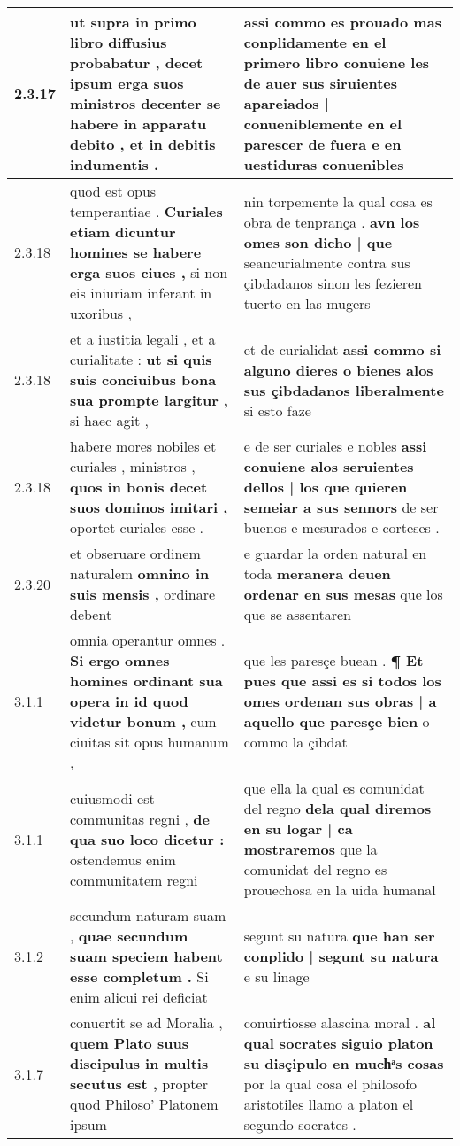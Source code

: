 \begin{tabular}{|p{1cm}|p{6.5cm}|p{6.5cm}|}
2.3.17 & ut supra in primo libro diffusius probabatur , \textbf{ decet ipsum erga suos ministros decenter se habere in apparatu debito , } et in debitis indumentis . & assi commo es prouado mas conplidamente en el primero libro \textbf{ conuiene les de auer sus siruientes apareiados | conueniblemente en el parescer de fuera } e en uestiduras conuenibles \\\hline
2.3.18 & quod est opus temperantiae . \textbf{ Curiales etiam dicuntur homines se habere erga suos ciues , } si non eis iniuriam inferant in uxoribus , & nin torpemente la qual cosa es obra de tenprança . \textbf{ avn los omes son dicho | que } seancurialmente contra sus çibdadanos sinon les fezieren tuerto en las mugers \\\hline
2.3.18 & et a iustitia legali , et a curialitate : \textbf{ ut si quis suis conciuibus bona sua prompte largitur , } si haec agit , & et de curialidat \textbf{ assi commo si alguno dieres o bienes alos sus çibdadanos liberalmente } si esto faze \\\hline
2.3.18 & habere mores nobiles et curiales , ministros , \textbf{ quos in bonis decet suos dominos imitari , } oportet curiales esse . & e de ser curiales e nobles \textbf{ assi conuiene alos seruientes dellos | los que quieren semeiar a sus sennors } de ser buenos e mesurados e corteses . \\\hline
2.3.20 & et obseruare ordinem naturalem \textbf{ omnino in suis mensis , } ordinare debent & e guardar la orden natural en toda \textbf{ meranera deuen ordenar en sus mesas } que los que se assentaren \\\hline
3.1.1 & omnia operantur omnes . \textbf{ Si ergo omnes homines ordinant sua opera in id quod videtur bonum , } cum ciuitas sit opus humanum , & que les paresçe buean . \textbf{ ¶ Et pues que assi es si todos los omes ordenan sus obras | a aquello que paresçe bien } o commo la çibdat \\\hline
3.1.1 & cuiusmodi est communitas regni , \textbf{ de qua suo loco dicetur : } ostendemus enim communitatem regni & que ella la qual es comunidat del regno \textbf{ dela qual diremos en su logar | ca mostraremos } que la comunidat del regno es prouechosa en la uida humanal \\\hline
3.1.2 & secundum naturam suam , \textbf{ quae secundum suam speciem habent esse completum . } Si enim alicui rei deficiat & segunt su natura \textbf{ que han ser conplido | segunt su natura } e su linage \\\hline
3.1.7 & conuertit se ad Moralia , \textbf{ quem Plato suus discipulus in multis secutus est , } propter quod Philoso’ Platonem ipsum & conuirtiosse alascina moral . \textbf{ al qual socrates siguio platon su disçipulo en muchͣs cosas } por la qual cosa el philosofo aristotiles llamo a platon el segundo socrates . \\\hline

\end{tabular}
